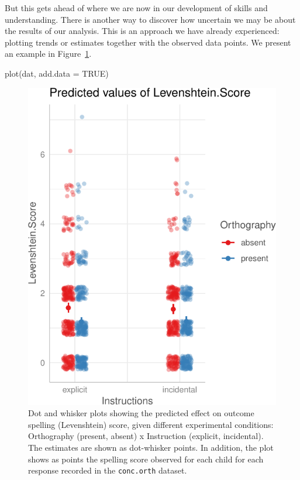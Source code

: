 \documentclass[
  letterpaper,
  DIV=11,
  numbers=noendperiod]{scrreprt}
\newenvironment{Shaded}{\begin{snugshade}}{\end{snugshade}}
\newcommand{\AttributeTok}[1]{\textcolor[rgb]{0.40,0.45,0.13}{#1}}
\newcommand{\ConstantTok}[1]{\textcolor[rgb]{0.56,0.35,0.01}{#1}}
\newcommand{\FunctionTok}[1]{\textcolor[rgb]{0.28,0.35,0.67}{#1}}
\newcommand{\NormalTok}[1]{\textcolor[rgb]{0.00,0.23,0.31}{#1}}
\begin{document}
But this gets ahead of where we are now in our development of skills and
understanding. There is another way to discover how uncertain we may be
about the results of our analysis. This is an approach we have already
experienced: plotting trends or estimates together with the observed
data points. We present an example in
Figure~\ref{fig-effects-dotwhisker-raw}.

\begin{Shaded}
\begin{Highlighting}[numbers=left,,]
\FunctionTok{plot}\NormalTok{(dat, }\AttributeTok{add.data =} \ConstantTok{TRUE}\NormalTok{)}
\end{Highlighting}
\end{Shaded}

\begin{figure}[H]

{\centering \includegraphics{visualization_files/figure-pdf/fig-effects-dotwhisker-raw-1.pdf}

}

\caption{\label{fig-effects-dotwhisker-raw}Dot and whisker plots showing
the predicted effect on outcome spelling (Levenshtein) score, given
different experimental conditions: Orthography (present, absent) x
Instruction (explicit, incidental). The estimates are shown as
dot-whisker points. In addition, the plot shows as points the spelling
score observed for each child for each response recorded in the
\texttt{conc.orth} dataset.}

\end{figure}
\end{document}
